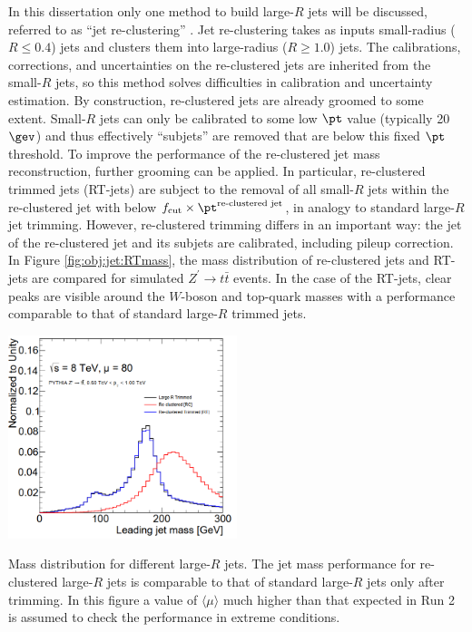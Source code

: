  In this dissertation only one method to build large-$R$ jets will be discussed, referred to as ``jet re-clustering'' \cite{Nachman:2014kla}. Jet re-clustering takes as inputs small-radius ($R\le0.4$) jets and clusters them into large-radius ($R\ge1.0$) jets. The calibrations, corrections, and uncertainties on the re-clustered jets are inherited from the small-$R$ jets, so this method solves difficulties in calibration and uncertainty estimation.
By construction, re-clustered jets are already groomed to some extent. Small-$R$ jets can only be calibrated to some low $\pt$ value (typically 20 $\gev$) and thus effectively ``subjets'' are removed that are below this fixed $\pt$ threshold. To improve the performance of the re-clustered jet mass reconstruction, further grooming can be applied. In particular, re-clustered trimmed jets (RT-jets) are subject to the removal of all small-$R$ jets within the re-clustered jet with \pt below $f_{\rm cut}\times \pt^{\text{\rm re-clustered jet}}$, in analogy to standard large-$R$ jet trimming.  However, re-clustered trimming differs in an important way:  the jet \pt of the re-clustered jet and its subjets are calibrated, including pileup correction.
In Figure \ref{fig:obj:jet:RTmass}, the mass distribution of re-clustered jets and RT-jets are compared for simulated $Z^{\prime}\to t\bar{t}$ events. In the case of the RT-jets, clear peaks are visible around the $W$-boson and top-quark masses with a performance comparable to that of standard large-$R$ trimmed jets.

\bfig[t!]
\centering
\includegraphics[width=0.5\textwidth]{figures/Objects/RTmass.png}
\captionsetup{width=0.85\textwidth} \caption{\small Mass distribution for different large-$R$ jets. The jet mass performance for re-clustered large-$R$ jets is comparable to that of standard large-$R$ jets only after trimming. In this figure a value of $\langle\mu\rangle$ much higher than that expected in Run 2 is assumed to check the performance in extreme conditions.}
\label{fig:obj:jet:RTmass}
\efig

